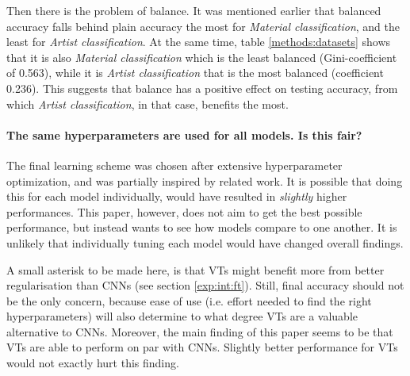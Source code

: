 Then there is the problem of balance. It was mentioned earlier that balanced accuracy falls behind plain accuracy the most for \textit{Material classification}, and the least for \textit{Artist classification}. At the same time, table \ref{methods:datasets} shows that it is also \textit{Material classification} which is the least balanced (Gini-coefficient of 0.563), while it is \textit{Artist classification} that is the most balanced (coefficient 0.236). This suggests that balance has a positive effect on testing accuracy, from which \textit{Artist classification}, in that case, benefits the most.


\paragraph{The same hyperparameters are used for all models. Is this fair?}
The final learning scheme was chosen after extensive hyperparameter optimization, and was partially inspired by related work. It is possible that doing this for each model individually, would have resulted in \textit{slightly} higher performances. This paper, however, does not aim to get the best possible performance, but instead wants to see how models compare to one another. It is unlikely that individually tuning each model would have changed overall findings.

A small asterisk to be made here, is that VTs might benefit more from better regularisation than CNNs (see section \ref{exp:int:ft}). Still, final accuracy should not be the only concern, because ease of use (i.e. effort needed to find the right hyperparameters) will also determine to what degree VTs are a valuable alternative to CNNs. Moreover, the main finding of this paper seems to be that VTs are able to perform on par with CNNs. Slightly better performance for VTs would not exactly hurt this finding.

